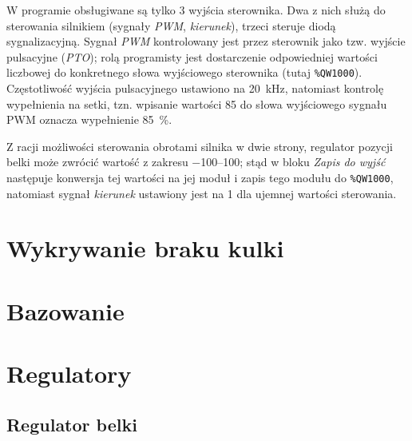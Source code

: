 W programie obsługiwane są tylko \num{3} wyjścia sterownika. Dwa z nich służą do sterowania silnikiem (sygnały \textit{PWM}, \textit{kierunek}), trzeci steruje diodą sygnalizacyjną. Sygnał \textit{PWM} kontrolowany jest przez sterownik jako tzw. wyjście pulsacyjne (\textit{PTO}); rolą programisty jest dostarczenie odpowiedniej wartości liczbowej do konkretnego słowa wyjściowego sterownika (tutaj \texttt{\%QW1000}). Częstotliwość wyjścia pulsacyjnego ustawiono na \SI{20}{\kilo\hertz}, natomiast kontrolę wypełnienia na setki, tzn. wpisanie wartości \num{85} do słowa wyjściowego sygnału PWM oznacza wypełnienie \SI{85}{\percent}.

Z racji możliwości sterowania obrotami silnika w dwie strony, regulator pozycji belki może zwrócić wartość z zakresu \numrange[range-phrase={ do }]{-100}{100}; stąd w bloku \textit{Zapis do wyjść} następuje konwersja tej wartości na jej moduł i zapis tego modułu do \texttt{\%QW1000}, natomiast sygnał \textit{kierunek} ustawiony jest na \num{1} dla ujemnej wartości sterowania.




\section{Wykrywanie braku kulki}
\label{sec:ch7_wykrywanie_braku_kulki}


\section{Bazowanie}
\label{sec:ch7_bazowanie}


\section{Regulatory}
\label{sec:ch7_regulatory}


\subsection{Regulator belki}
\label{subsec:ch7_regulator_belki}
